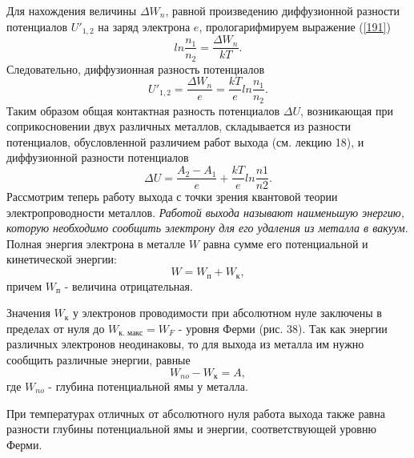 \documentclass[a4paper,10pt]{book}
\begin{document}
Для нахождения величины $\Delta W_n$, равной произведению диффузионной разности потенциалов $U'_{1,2}$ на заряд электрона $e$, прологарифмируем выражение (\ref{191})
\begin{equation}\label{192}
ln\frac{n_1}{n_2} = \frac{\Delta W_n}{kT}. 
\end{equation}
Следовательно, диффузионная разность потенциалов
\begin{equation}\label{193}
 U'_{1,2} = \frac{\Delta W_n}{e} = \frac{kT}{e}ln\frac{n_1}{n_2}.
\end{equation}
Таким образом общая контактная разность потенциалов $\Delta U$, возникающая при соприкосновении двух различных металлов, складывается из разности потенциалов, обусловленной различием работ выхода (см. лекцию 18), и диффузионной разности потенциалов
\begin{equation}\label{194}
 \Delta U = \frac{A_2 - A_1}{e} + \frac{kT}{e}ln\frac{n1}{n2}.
\end{equation}
Рассмотрим теперь работу выхода с точки зрения квантовой теории электропроводности металлов. \emph{Работой выхода называют наименьшую энергию, которую необходимо сообщить электрону для его удаления из металла в вакуум}. Полная энергия электрона в металле $W$ равна сумме его потенциальной и кинетической энергии:
\begin{equation*}
 W = W_\text{п} + W_\text{к},
\end{equation*}
причем $W_\text{п}$ - величина отрицательная.

Значения $W_\text{к}$ у электронов проводимости при абсолютном нуле заключены в пределах от нуля до $W_\text{к. макс} = W_F$ - уровня Ферми (рис. 38). Так как энергии различных электронов неодинаковы, то для выхода из металла им нужно сообщить различные энергии, равные 
\begin{equation*}
 W_{no} - W_\text{к} = A,
\end{equation*}
где $W_{no}$ - глубина потенциальной ямы у металла.

При температурах отличных от абсолютного нуля работа выхода также равна разности глубины потенциальной ямы и энергии, соответствующей уровню Ферми.
\end{document}
